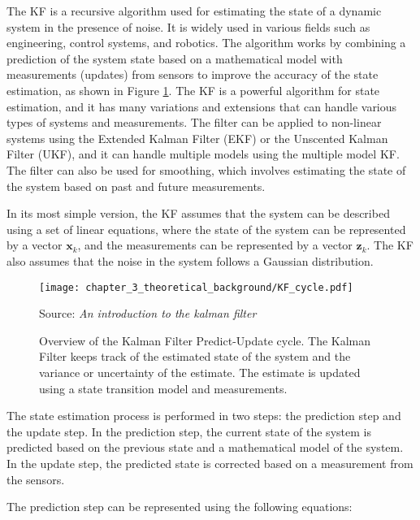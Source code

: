 The \acf{KF} \cite{kalman1960new} is a recursive algorithm used for estimating the state of a dynamic system in the presence of noise. It is widely used in various fields such as engineering, control systems, and robotics. The algorithm works by combining a prediction of the system state based on a mathematical model with measurements (updates) from sensors to improve the accuracy of the state estimation, as shown in Figure \ref{fig:chapter_3_theoretical_background/KF_cycle}. The \ac{KF} is a powerful algorithm for state estimation, and it has many variations and extensions that can handle various types of systems and measurements. The filter can be applied to non-linear systems using the Extended Kalman Filter (EKF) or the Unscented Kalman Filter (UKF), and it can handle multiple models using the multiple model \ac{KF}. The filter can also be used for smoothing, which involves estimating the state of the system based on past and future measurements.

In its most simple version, the \ac{KF} assumes that the system can be described using a set of linear equations, where the state of the system can be represented by a vector $\mathbf{x}_k$, and the measurements can be represented by a vector $\mathbf{z}_k$. The \ac{KF} also assumes that the noise in the system follows a Gaussian distribution.

\begin{figure}[!h]
	\centering
	\captionsetup{justification=justified}
	\texttt{[image: chapter\_3\_theoretical\_background/KF\_cycle.pdf]}
	\caption[Overview of the Kalman Filter Predict-Update cycle]{Overview of the Kalman Filter Predict-Update cycle. The Kalman Filter keeps track of the estimated state of the system and the variance or uncertainty of the estimate. The estimate is updated using a state transition model and measurements.}
	Source: \textit{An introduction to the kalman filter} \cite{bishop2001introduction}
	\label{fig:chapter_3_theoretical_background/KF_cycle}
\end{figure}

The state estimation process is performed in two steps: the prediction step and the update step. In the prediction step, the current state of the system is predicted based on the previous state and a mathematical model of the system. In the update step, the predicted state is corrected based on a measurement from the sensors.

The prediction step can be represented using the following equations:

